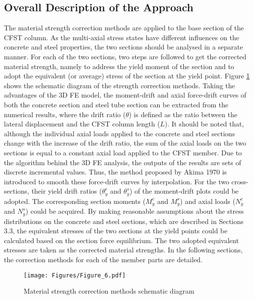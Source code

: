 \documentclass[12pt,a4]{article}
\begin{document}
	\subsection{Overall Description of the Approach}
	The material strength correction methods are applied to the base section of the CFST column. As the multi-axial stress states have different influences on the concrete and steel properties, the two sections should be analysed in a separate manner. For each of the two sections, two steps are followed to get the corrected material strength, namely to address the yield moment of the section and to adopt the equivalent (or average) stress of the section at the yield point. Figure \ref{fig-5} shows the schematic diagram of the strength correction methods. Taking the advantages of the 3D FE model, the moment-drift and axial force-drift curves of both the concrete section and steel tube section can be extracted from the numerical results, where the drift ratio ($\theta$) is defined as the ratio between the lateral displacement and the CFST column length ($L$). It should be noted that, although the individual axial loads applied to the concrete and steel sections change with the increase of the drift ratio, the sum of the axial loads on the two sections is equal to a constant axial load applied to the CFST member. Due to the algorithm behind the 3D FE analysis, the outputs of the results are sets of discrete incremental values. Thus, the method proposed by Akima 1970 \cite{Akima1970} is introduced to smooth these force-drift curves by interpolation. For the two cross-sections, their yield drift ratios ($θ_y^c$ and $θ_y^s$) of the moment-drift plots could be adopted. The corresponding section moments ($M_y^c$ and $M_y^s$) and axial loads ($N_y^c$ and $N_y^s$) could be acquired. By making reasonable assumptions about the stress distributions on the concrete and steel sections, which are described in Sections 3.3, the equivalent stresses of the two sections at the yield points could be calculated based on the section force equilibrium. The two adopted equivalent stresses are taken as the corrected material strengths. In the following sections, the correction methods for each of the member parts are detailed.
	\par
	\begin{figure}[h]
		\centering
		\texttt{[image: Figures/Figure\_6.pdf]}
		\caption{Material strength correction methods schematic diagram}
		\label{fig-5}
	\end{figure}
	\par
	
\end{document}
